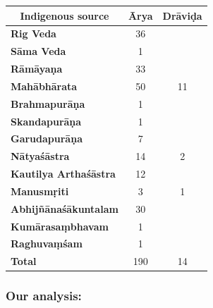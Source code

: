 \begin{table}[!htbp]
\caption{204 occurences of \textit{Ārya} and \textit{Drāviḍa}\\ from 13 different sources}\label{art3-tab1}
\begin{longtable}{@{}|l|c|c|@{}}
\hline
\multicolumn{1}{|c|}{\textbf{Indigenous source}} & \multicolumn{1}{c|}{\textbf{Ārya}} & \multicolumn{1}{c|}{\textbf{Drāviḍa}} \\
\hline
\textbf{Rig Veda} & 36 &  \\
\hline
\textbf{Sāma Veda} & 1 &  \\
\hline
\textbf{Rāmāyaṇa} & 33 &  \\
\hline
\textbf{Mahābhārata} & 50 & 11 \\
\hline
\textbf{Brahmapurāṇa} & 1 &  \\
\hline
\textbf{Skandapurāṇa} & 1 &  \\
\hline
\textbf{Garudapurāṇa} & 7 &  \\
\hline
\textbf{Nātyaśāstra} & 14 & 2 \\
\hline
\textbf{Kautilya Arthaśāstra} & 12 &  \\
\hline
\textbf{Manusmṛiti} & 3 & 1 \\
\hline
\textbf{Abhijñānaśākuntalam} & 30 &  \\
\hline
\textbf{Kumārasaṃbhavam} & 1 &  \\
\hline
\textbf{Raghuvaṃśam} & 1 &  \\
\hline
\textbf{Total} & 190 & 14 \\
\hline
\end{longtable}
\end{table}


\subsubsection{Our analysis:}

